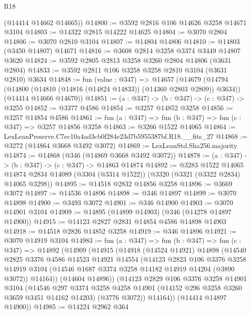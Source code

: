 \begin{lexlean}{R18}
\begin{coremodule}
      (@14414 @14662 @14665))
@14800 := @3592 @2816 @106 @14626 @3258 @14671 @3104
@14803 := @14322 @2815 @14222 @14625
@14804 := @3070 @2804
@14806 := @3070 @2810 @3104
@14807 := @14804 @14806
@14810 := @14803 (@3450 @14807) @14671
@14816 := @3608 @2814 @3258 @3374 @3449 @14807 @3620
@14824 := @3592 @2805 @2813 @3258 @3260 @2804 @14806 (@3631 @2804)
@14833 := @3592 @2811 @106 @3258 @3258 @2810 @3104 (@3631 @2810) @3634
@14848 := fun (value : @347) =>
  @14657
    (@14679
      (@14794 (@14800 (@14810 (@14816 (@14824 @14833)) (@14360 @2803 @2809)) @3634))
      (@14414 @14666 @14670))
@14851 := (a : @347) -> (b : @347) -> (c : @347) -> @3255
@14852 := @3377 @4586
@14854 := @3257 @14852 @3258
@14856 := @3257 @14854 @4586
@14861 := fun (a : @347) => fun (b : @347) => fun (c : @347) => @3257 @14856 @3258
@14863 := @3266 @1522 @14065
@14864 := LexLeanPreserve.C7ec10a4ad3cb0f284e23d7b5955387bf.R18.__fits_27
@14868 := @3272 (@14864 @3668 @3492 @3072)
@14869 := LexLeanStd.Sha256.majority
@14874 := @14868 (@346 (@14869 @3668 @3492 @3072))
@14878 := (a : @347) -> (b : @347) -> (c : @347) -> @14863 @14874
@14892 := @3283
    @1522
    @14065
    @14874
    @2834
    @14089
    (@3304 (@3314 @1522))
    (@3320 (@3321 (@3322 @2834) @14065 @3298))
@14895 := @14518 @2832 @14856 @3258
@14896 := @3669 @3072
@14897 := @14536 @14896
@14898 := @346 @14897
@14899 := @3070 @14898
@14900 := @3493 @3072
@14901 := @346 @14900
@14903 := @3070 @14901 @3104
@14909 := @14895 (@14899 @14903) (@346 (@14278 @14897 @14900))
@14915 := @14123 @2827 @2831 @14854 @4586 @14898 @14903
@14918 := @14518 @2826 @14852 @3258
@14919 := @346 @14896
@14921 := @3070 @14919 @3104
@14983 := fun (a : @347) =>
  fun (b : @347) =>
  fun (c : @347) =>
  @14892
    (@14909
      (@14915
        (@14918
          (@14524 @14921)
          @14898
          (@14540
            @2825
            @3376
            @4586
            @14523
            @14921
            @14554
            (@14123
              @2823
              @106
              @3376
              @3258
              @14919
              @3104
              (@14546 @1687 @3374 @3258 @14182 @14919 @14204 (@3890 @3072))
              @14164))
          (@14604 @14896))
        (@14123
          @2829
          @106
          @3376
          @3258
          @14901
          @3104
          (@14546
            @297
            @3374
            @3258
            @4258
            @14901
            (@14152 @296 @3258 @3260 @3659 @3451 @14162 @14203)
            (@3776 @3072))
          @14164))
      (@14414 @14897 @14900))
@14985 := @14224 @2962 @364

\end{coremodule}
\end{lexlean}
